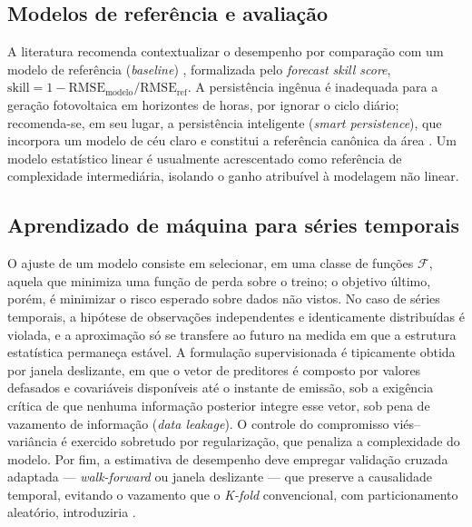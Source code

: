 \subsection{Modelos de referência e avaliação}

A literatura recomenda contextualizar o desempenho por comparação com um modelo de referência (\textit{baseline}) \citep{sarmas2022}, formalizada pelo \textit{forecast skill score}, $\mathrm{skill} = 1 - \mathrm{RMSE}_{\text{modelo}}/\mathrm{RMSE}_{\text{ref}}$. A persistência ingênua é inadequada para a geração fotovoltaica em horizontes de horas, por ignorar o ciclo diário; recomenda-se, em seu lugar, a persistência inteligente (\textit{smart persistence}), que incorpora um modelo de céu claro e constitui a referência canônica da área \citep{sarmas2022,markovics2022}. Um modelo estatístico linear é usualmente acrescentado como referência de complexidade intermediária, isolando o ganho atribuível à modelagem não linear.

\subsection{Aprendizado de máquina para séries temporais}

O ajuste de um modelo consiste em selecionar, em uma classe de funções $\mathcal{F}$, aquela que minimiza uma função de perda sobre o treino; o objetivo último, porém, é minimizar o risco esperado sobre dados não vistos. No caso de séries temporais, a hipótese de observações independentes e identicamente distribuídas é violada, e a aproximação só se transfere ao futuro na medida em que a estrutura estatística permaneça estável. A formulação supervisionada é tipicamente obtida por janela deslizante, em que o vetor de preditores é composto por valores defasados e covariáveis disponíveis até o instante de emissão, sob a exigência crítica de que nenhuma informação posterior integre esse vetor, sob pena de vazamento de informação (\textit{data leakage}). O controle do compromisso viés--variância é exercido sobretudo por regularização, que penaliza a complexidade do modelo. Por fim, a estimativa de desempenho deve empregar validação cruzada adaptada — \textit{walk-forward} ou janela deslizante — que preserve a causalidade temporal, evitando o vazamento que o \textit{K-fold} convencional, com particionamento aleatório, introduziria \citep{kappler2024}.
